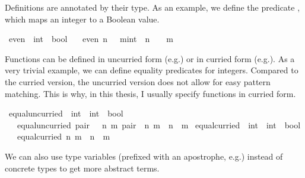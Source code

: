 \begin{isabellebody}
\begin{isamarkuptext}
Definitions are annotated by their type. As an example, we define the predicate , which maps an integer to a Boolean value.%
\end{isamarkuptext}\isamarkuptrue%
\isamarkupfalse%
\ even\ {\isacharcolon}{\kern0pt}{\isacharcolon}{\kern0pt}\ {\isacartoucheopen}int\ {\isasymRightarrow}\ bool{\isacartoucheclose}\isanewline
\ \ \ {\isacartoucheopen}even\ n\ {\isasymequiv}\ {\isasymexists}\ m{\isacharcolon}{\kern0pt}{\isacharcolon}{\kern0pt}int\ {\isachardot}{\kern0pt}\ n\ {\isacharequal}{\kern0pt}\ {}\ {\isacharasterisk}{\kern0pt}\ m{\isacartoucheclose}%
\begin{isamarkuptext}%
Functions can be defined in uncurried form (e.g.\@ {}) or in curried form (e.g.\@ {}). As a very trivial example, we can define equality predicates for integers. Compared to the curried version, the uncurried version does not allow for easy pattern matching. This is why, in this thesis, I usually specify functions in curried form.%
\end{isamarkuptext}\isamarkuptrue%
\isamarkupfalse%
\ equal{\isacharunderscore}{\kern0pt}uncurried\ {\isacharcolon}{\kern0pt}{\isacharcolon}{\kern0pt}\ {\isacartoucheopen}{\isacharparenleft}{\kern0pt}int\ {\isasymtimes}\ int{\isacharparenright}{\kern0pt}\ {\isasymRightarrow}\ bool{\isacartoucheclose}\isanewline
\ \ \ {\isacartoucheopen}equal{\isacharunderscore}{\kern0pt}uncurried\ pair\ {\isasymequiv}\ {\isasymexists}\ n\ m{\isachardot}{\kern0pt}\ pair\ {\isacharequal}{\kern0pt}\ {\isacharparenleft}{\kern0pt}n{\isacharcomma}{\kern0pt}\ m{\isacharparenright}{\kern0pt}\ {\isasymand}\ n\ {\isacharequal}{\kern0pt}\ m{\isacartoucheclose}\isanewline
\isanewline
{}\isamarkupfalse%
\ equal{\isacharunderscore}{\kern0pt}curried\ {\isacharcolon}{\kern0pt}{\isacharcolon}{\kern0pt}\ {\isacartoucheopen}int\ {\isasymRightarrow}\ int\ {\isasymRightarrow}\ bool{\isacartoucheclose}\isanewline
\ \ \ {\isacartoucheopen}equal{\isacharunderscore}{\kern0pt}curried\ n\ m\ {\isasymequiv}\ n\ {\isacharequal}{\kern0pt}\ m{\isacartoucheclose}%
\begin{isamarkuptext}%
We can also use type variables (prefixed with an apostrophe, e.g.\@ {}) instead of concrete types to get more abstract terms.%
\end{isamarkuptext}\isamarkuptrue%

\end{isabellebody}
